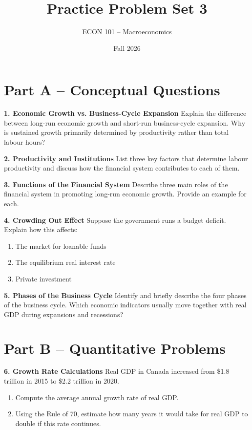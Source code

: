 \documentclass[12pt]{article}
\title{Practice Problem Set 3}
\author{ECON 101 -- Macroeconomics}
\date{Fall 2026}
\begin{document}
\maketitle

\section*{Part A – Conceptual Questions}

\textbf{1. Economic Growth vs. Business-Cycle Expansion}  
Explain the difference between long-run economic growth and short-run business-cycle expansion.  
Why is sustained growth primarily determined by productivity rather than total labour hours?



\textbf{2. Productivity and Institutions}  
List three key factors that determine labour productivity and discuss how the financial system contributes to each of them.



\textbf{3. Functions of the Financial System}  
Describe three main roles of the financial system in promoting long-run economic growth.  
Provide an example for each.



\textbf{4. Crowding Out Effect}  
Suppose the government runs a budget deficit. Explain how this affects:
\begin{enumerate}
    \item The market for loanable funds
    \item The equilibrium real interest rate
    \item Private investment
\end{enumerate}



\textbf{5. Phases of the Business Cycle}  
Identify and briefly describe the four phases of the business cycle.  
Which economic indicators usually move together with real GDP during expansions and recessions?

\newpage

\section*{Part B – Quantitative Problems}

\textbf{6. Growth Rate Calculations}  
Real GDP in Canada increased from \$1.8 trillion in 2015 to \$2.2 trillion in 2020.
\begin{enumerate}
    \item Compute the average annual growth rate of real GDP.
    \item Using the Rule of 70, estimate how many years it would take for real GDP to double if this rate continues.
\end{enumerate}
\end{document}
